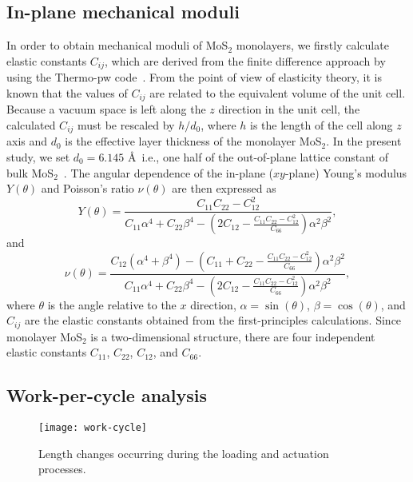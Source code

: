 \documentclass[12pt]{iopart}
\begin{document}
\subsection{In-plane mechanical moduli}
In order to obtain mechanical moduli of MoS$_2$ monolayers, we firstly calculate elastic constants $C_{ij}$, which are derived from the finite difference approach by using the Thermo-pw code~\cite{dal2016elastic}.  From the point of view of elasticity theory, it is known that the values of $C_{ij}$ are related to the equivalent volume of the unit cell.  Because a vacuum
space is left along the $z$ direction in the unit cell, the calculated
$C_{ij}$ must be rescaled by $h/d_0$, where $h$ is the length of the
cell along $z$ axis and $d_0$ is the effective layer thickness of the
monolayer MoS$_2$.  In the present study, we set $d_0=6.145$ \AA\,
i.e., one half of the out-of-plane lattice constant of bulk
MoS$_2$~\cite{young1968lattice}. The angular dependence of the in-plane ($xy$-plane) Young's modulus $Y(\theta)$ and Poisson's ratio $\nu(\theta)$ are then expressed as~\cite{wang2015electro}
\begin{equation}
\label{eq:young}
  Y(\theta)=\frac{C_{11}C_{22}-C_{12}^2}{C_{11}\alpha^4+C_{22}\beta^4-
  \left(2C_{12}-\displaystyle\frac{C_{11}C_{22}-C_{12}^2}{C_{66}}\right)
  \alpha^2\beta^2},
\end{equation}
and
\begin{equation}
\label{eq:poisson}
  \nu(\theta)=\frac{C_{12}(\alpha^4+\beta^4)-\left(C_{11}+C_{22}-
  \displaystyle\frac{C_{11}C_{22}-C_{12}^2}{C_{66}}\right)
  \alpha^2\beta^2}{C_{11}\alpha^4+C_{22}\beta^4-
  \left(2C_{12}-\displaystyle\frac{C_{11}C_{22}-C_{12}^2}{C_{66}}\right)
  \alpha^2 \beta^2},
\end{equation}
where $\theta$ is the angle relative to the $x$ direction, $\alpha=\sin(\theta)$, $\beta=\cos(\theta)$, and $C_{ij}$ are
the elastic constants obtained from the first-principles calculations.
Since monolayer MoS$_2$ is a two-dimensional structure, there are
four independent elastic constants $C_{11}$, $C_{22}$, $C_{12}$, and
$C_{66}$.

\subsection{Work-per-cycle analysis}
\begin{figure}[t!]
  \centering \texttt{[image: work-cycle]}
  \caption{\label{fig:work-cycle}Length changes occurring during the
    loading and actuation processes.}
\end{figure}
\end{document}
